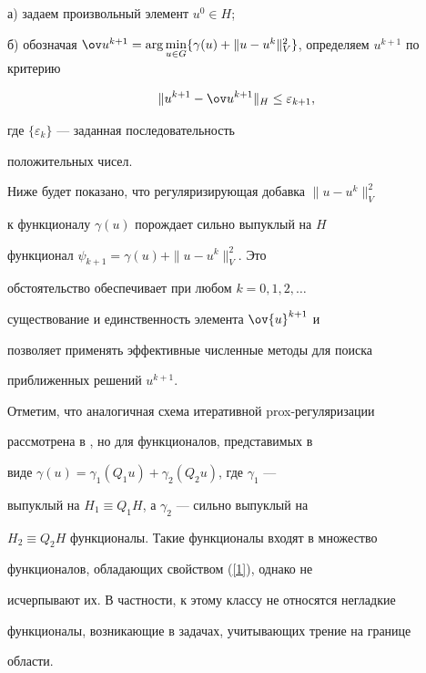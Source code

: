а) задаем произвольный элемент $u^0\in H$;





б) обозначая $\ov u^{k+1}=\arg\min\limits_{u\in


G}\{\gamma(u)+\|u-u^{k}\|^2_V\}$, определяем $u^{k+1}$ по критерию


$$


\|u^{k+1}-\ov u^{k+1}\|_H\le \varepsilon_{k+1},


$$


где $\{\varepsilon_{k}\}$ --- заданная последовательность


положительных чисел.





Ниже будет показано, что регуляризирующая добавка $\|u-u^k\|^2_V$


к функционалу $\gamma(u)$ порождает сильно выпуклый на $H$


функционал $\psi_{k+1}=\gamma(u)+\|u-u^k\|^2_V$. Это


обстоятельство обеспечивает при любом $k=0, 1, 2, \dotsc$


существование и единственность элемента $\ov{u}^{k+1}$ и


позволяет применять эффективные численные методы для поиска


приближенных решений $u^{k+1}$.





Отметим, что аналогичная схема итеративной prox-регуляризации


рассмотрена в \cite{3}, но для функционалов, представимых в


виде $\gamma(u)=\gamma_1(Q_1u)+\gamma_2(Q_2u)$, где $\gamma_1$ ---


выпуклый на $H_1\equiv Q_1H$, а $\gamma_2$ --- сильно выпуклый на


$H_2\equiv Q_2H$ функционалы. Такие функционалы входят в множество


функционалов, обладающих свойством (\ref{1}), однако не


исчерпывают их. В частности, к этому классу не относятся негладкие


функционалы, возникающие в задачах, учитывающих трение на границе


области.





